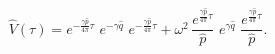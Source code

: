 \begin{equation}\label{e^Q=e^q}
\hat V(\tau)=
e^{-\frac{\gamma\hat p}{4\pi}\tau}\,\, 
e^{-\gamma \hat q}\,\,e^{-\frac{\gamma\hat p}{4\pi}\tau}+
\omega^2\,\frac{e^{\frac{\gamma\hat p}{4\pi}\tau}}{\hat p}\,\,
e^{\gamma \hat q}\,\,\frac{e^{\frac{\gamma\hat p}{4\pi}\tau}}{\hat p}.
\end{equation}

